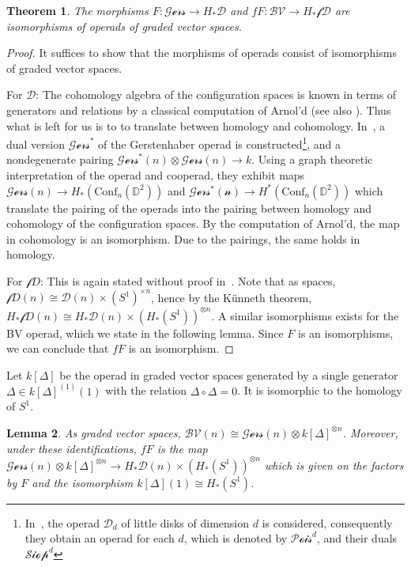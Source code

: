 \documentclass{scrartcl}
\theoremstyle{plain}
\newtheorem{theorem}{Theorem}[section]
\newtheorem{lemma}[theorem]{Lemma}
\theoremstyle{definition}
\newcommand{\comp}{\circ}
\begin{document}
\begin{theorem}\label{foobar}
    The morphisms $F\colon \mathcal{Gers} \to H_*\mathcal D$ and $fF\colon \mathcal{BV} \to H_*\mathcal {fD}$ are isomorphisms of operads of graded vector spaces. 
\end{theorem}
\begin{proof}
    It suffices to show that the morphisms of operads consist of isomorphisms of graded vector spaces. 

    For $\mathcal D$: The cohomology algebra of the configuration spaces is known in terms of generators and relations by a classical computation of Arnol'd \cite{arnold2014cohomology} (see also \cite{sinha2010homology}). 
    Thus what is left for us is to to translate between homology and cohomology. In~\cite{sinha2010homology}, a dual version $\mathcal{Gers}^*$ of the Gerstenhaber operad is constructed\footnote{In~\cite{sinha2010homology}, the operad $\mathcal D_d$ of little disks of dimension $d$ is considered, consequently they obtain an operad for each $d$, which is denoted by $\mathcal {Pois}^d$, and their duals $\mathcal {Siop}^d$}, 
    and a nondegenerate pairing $\mathcal {Gers}^*(n) \otimes \mathcal {Gers}(n) \to k$. Using a graph theoretic interpretation of the operad and cooperad, they exhibit maps $\mathcal {Gers}(n)\to H_*(\mathrm{Conf}_n(\mathds D^2))$ and $ \mathcal {Gers^*(n)}\to H^*(\mathrm{Conf}_n(\mathds D^2))$ which translate the pairing of the operads into the pairing between homology and cohomology of the configuration spaces. By the computation of Arnol'd, the map in cohomology is an isomorphism. Due to the pairings, the same holds in homology.

    For $\mathcal fD$: This is again stated without proof in~\cite{cohen2006string}. Note that as spaces, $\mathcal fD(n) \cong \mathcal D(n) \times {(S^1)}^{\times n}$, hence by the Künneth theorem, $H_*\mathcal fD(n) \cong H_*\mathcal D(n) \times {(H_*(S^1))}^{\otimes n}$. A similar isomorphisms exists for the BV operad, which we state in the following lemma. Since $F$ is an isomorphisms, we can conclude that $fF$ is an isomorphism. 
\end{proof}
Let $k[\Delta]$ be the operad in graded vector spaces generated by a single generator $\Delta\in k{[\Delta]}^{(1)}(1)$ with the relation $\Delta \comp \Delta = 0$. It is isomorphic to the homology of $S^1$.
\begin{lemma} As graded vector spaces, $\mathcal{BV}(n) \cong \mathcal{Gers}(n) \otimes k{[\Delta]}^{\otimes n}$. Moreover, under these identifications, $fF$ is the map $\mathcal{Gers}(n) \otimes k{[\Delta]}^{\otimes n} \to H_*\mathcal D(n) \times (H_*(S^1))^{\otimes n}$ which is given on the factors by $F$ and the isomorphism $k[\Delta](1) \cong H_*(S^1)$.
\end{lemma}
\end{document}
